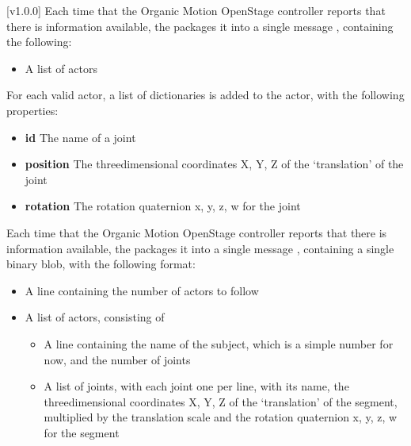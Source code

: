 [v1.0.0]
Each time that the Organic Motion OpenStage controller reports that there is information
available, the  packages it into a single message
\openSq{}\closeSq, containing the following:
\begin{itemize}
\item A list of actors
\end{itemize}

For each valid actor, a list of dictionaries is added to the actor, with the following
properties:
\begin{itemize}
\item\textbf{id} The name of a joint
\item\exSp\textbf{position} The three\longDash{}dimensional coordinates \openSq{}X, Y,
Z\closeSq{} of the `translation' of the joint
\item\exSp\textbf{rotation} The rotation quaternion \openSq{}x, y, z, w\closeSq{} for the
joint
\end{itemize}
\primaryEnd
{}
Each time that the Organic Motion OpenStage controller reports that there is information
available, the  packages it into a single message
\openSq{}\closeSq, containing a single binary blob, with the following
format:
\begin{itemize}
\item A line containing the number of actors to follow
\item\exSp{}A list of actors, consisting of
\begin{itemize}
\item A line containing the name of the subject, which is a simple number for now, and the
number of joints
\item\exSp{}A list of joints, with each joint one per line, with its name, the
three\longDash{}dimensional coordinates \openSq{}X, Y, Z\closeSq{} of the `translation'
of the segment, multiplied by the translation scale and the rotation quaternion
\openSq{}x, y, z, w\closeSq{} for the segment
\end{itemize}
\end{itemize}
\primaryEnd{}
